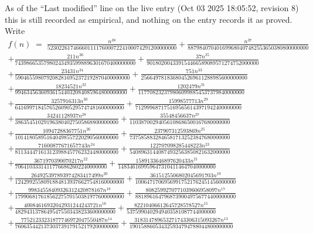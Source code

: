 \documentclass[11pt,a4paper]{article}
\theoremstyle{plain}
\theoremstyle{definition}
\begin{document}
As of the ``Last modified'' line on the live entry (Oct 03 2025 18:05:52, revision 8) this is still
recorded as empirical, and nothing on the entry records it as proved. Write
\begin{multline*}
f(n)\;=\;\frac{n^{38}}{523022617466601111760007224100074291200000000} + \frac{n^{37}}{887984070401699680407482553650380800000000} \\
+ \frac{211 n^{36}}{743986653579802434935998896301670400000000} + \frac{37 n^{35}}{901802004339154466589089571274752000000} \\
+ \frac{23431 n^{34}}{5904655980792082816952372192870400000000} + \frac{751 n^{33}}{2566497818368045269611288985600000000} \\
+ \frac{18234521 n^{32}}{994634563609361544032084085964800000000} + \frac{1202479 n^{31}}{1177082323798060998854537379840000000} \\
+ \frac{3257916313 n^{30}}{64169971845765260905295747481600000000} + \frac{15998577713 n^{29}}{7129996871751695656143971942400000000} \\
+ \frac{34241128937 n^{28}}{386354510291963804027505868800000000} + \frac{35548456637 n^{27}}{11038700294056108686500167680000000} \\
+ \frac{10947288367751 n^{26}}{101418058951640498557220290560000000} + \frac{237907312593869 n^{25}}{73758588328465817132523847680000000} \\
+ \frac{71600877671657743 n^{24}}{811344471613123988457762324480000000} + \frac{122707098285448223 n^{23}}{54089631440874932563850821632000000} \\
+ \frac{3671970390070217 n^{22}}{70641033314117766862602240000000} + \frac{1589133646897620433 n^{21}}{1483461699596473104114647040000000} \\
+ \frac{264925397893974283417499 n^{20}}{12429925580918848139376627548160000000} + \frac{3615125506802045691703 n^{19}}{10064717069569917521762451456000000} \\
+ \frac{99834558409326312420878167 n^{18}}{17990681761856227570150381977600000000} + \frac{8082599270771039606958097 n^{17}}{88189616479687390049756774400000000} \\
+ \frac{40084616932042931244243721 n^{16}}{48294313786495475503438233600000000} + \frac{82210406612645728578527 n^{15}}{5375990402949403581087744000000} \\
+ \frac{77521233231877746972047550487 n^{14}}{760635442137303739179152179200000000} + \frac{318314789653271743306315093267 n^{13}}{190158860534325934794788044800000000} \\

\end{multline*}
\end{document}

